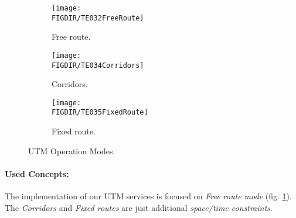 \begin{figure}[H]
    \centering
    \begin{subfigure}{0.32\textwidth}
        \centering
        \texttt{[image: \\FIGDIR/TE032FreeRoute]}
        \caption{Free route.}
        \label{fig:UTMFreeRouteMode}
    \end{subfigure}
    \begin{subfigure}{0.32\textwidth}
        \centering
        \texttt{[image: \\FIGDIR/TE034Corridors]} 
        \caption{Corridors.}
        \label{fig:CorridorMode}
    \end{subfigure}
    \begin{subfigure}{0.32\textwidth}
        \centering
        \texttt{[image: \\FIGDIR/TE035FixedRoute]} 
        \caption{Fixed route.}
        \label{fig:fixedRoute}
    \end{subfigure}
    
    \caption{UTM Operation Modes.}
    \label{fig:utmOperationModes}
\end{figure}

\paragraph{Used Concepts:} The implementation of our UTM services  is focused on \emph{Free route mode} (fig. \ref{fig:UTMFreeRouteMode}). The \emph{Corridors} and \emph{Fixed routes} are just additional \emph{space/time constraints}.
